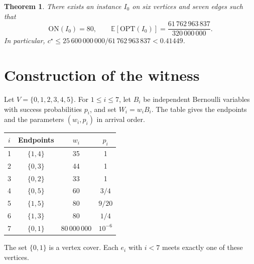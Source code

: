 \documentclass[11pt,a4paper]{article}
\newcommand{\E}{\mathbb{E}}
\newcommand{\OPT}{\mathrm{OPT}}
\newcommand{\numon}{25\,600\,000\,000}
\newcommand{\numoff}{61\,762\,963\,837}
\newcommand{\masa}{320\,000\,000}
\newtheorem{teorema}{Theorem}
\newcommand{\ON}{\mathrm{ON}}
\begin{document}
\begin{teorema}\label{thm:main}
There exists an instance \(I_0\) on six vertices and seven edges such that
\[
 \ON(I_0)=80,\qquad \E[\OPT(I_0)]=\frac{\numoff}{\masa}.
\]
In particular, \(c^\star\leq \numon/\numoff<0.41449\).
\end{teorema}

\section{Construction of the witness}\label{sec:inst}
Let \(V=\{0,1,2,3,4,5\}\). For \(1\leq i\leq7\), let \(B_i\) be independent Bernoulli variables with success probabilities \(p_i\), and set \(W_i=w_iB_i\). The table gives the endpoints and the parameters \((w_i,p_i)\) in arrival order.

\smallskip
\noindent\begin{minipage}[c]{.49\linewidth}\centering\small
\begin{tabular}{@{}cccc@{}}\toprule
\(i\)& Endpoints & \(w_i\) & \(p_i\)\\\midrule
1 & \(\{1,4\}\)&35&1\\
2 & \(\{0,3\}\)&44&1\\
3 & \(\{0,2\}\)&33&1\\
4 & \(\{0,5\}\)&60&\(3/4\)\\
5 & \(\{1,5\}\)&80&\(9/20\)\\
6 & \(\{1,3\}\)&80&\(1/4\)\\
7 & \(\{0,1\}\)&\(80\,000\,000\)&\(10^{-6}\)\\\bottomrule
\end{tabular}
\end{minipage}\hfill
\begin{minipage}[c]{.47\linewidth}\centering
{}

\small The set \(\{0,1\}\) is a vertex cover. Each \(e_i\) with \(i<7\) meets exactly one of these vertices.
\end{minipage}
\end{document}
